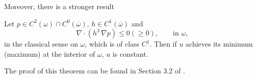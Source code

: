 Moreover, there is a stronger result 
\begin{theorem}\label{theo:strong_max_princ_reynolds}
Let $p\in C^2(\omega)\cap C^0(\overline{\omega})$, $h\in C^1(\overline{\omega})$ and
$$\nabla\cdot \left(h^3\,\nabla p\right)\leq 0\left(\geq 0\right),\qquad \text{in }\omega,$$
in the classical sense on $\omega$, which is of class $C^1$. Then if $u$ achieves its minimum (maximum) at the interior of $\omega$, $u$ is constant.
\end{theorem}
The proof of this theorem can be found in Section 3.2 of \cite{trudinger1983}.